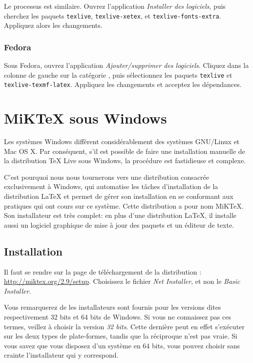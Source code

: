 Le processus est similaire. Ouvrez l'application \emph{Installer des logiciels}, puis cherchez les paquets \verb|texlive|, \verb|texlive-xetex|, et \verb|texlive-fonts-extra|. Appliquez alors les changements.

\subsubsection{Fedora}

Sous Fedora, ouvrez l'application \emph{Ajouter/supprimer des logiciels}. Cliquez dans la colonne de gauche sur la catégorie , puis sélectionnez les paquets \verb|texlive| et \verb|texlive-texmf-latex|. Appliquez les changements et acceptez les dépendances.

\section{MiKTeX sous Windows}


Les systèmes Windows diffèrent considérablement des systèmes GNU/Linux et Mac OS X. Par conséquent, s'il est possible de faire une installation manuelle de la distribution TeX Live sous Windows, la procédure est fastidieuse et complexe.

C'est pourquoi nous nous tournerons vers une distribution consacrée exclusivement à Windows, qui automatise les tâches d'installation de la distribution \LaTeX{} et permet de gérer son installation en se conformant aux pratiques qui ont cours sur ce système. Cette distribution a pour nom MiKTeX. Son installateur est très complet: en plus d'une distribution \LaTeX{}, il installe aussi un logiciel graphique de mise à jour des paquets et un éditeur de texte.

\subsection{Installation}

Il faut se rendre sur la page de téléchargement de la distribution : \url{http://miktex.org/2.9/setup}. Choisissez le fichier \emph{Net Installer}, et non le \emph{Basic Installer}.

\begin{attention}
Vous remarquerez de les installateurs sont fournis pour les versions dites respectivement 32 bits et 64 bits de Windows. Si vous ne connaissez pas ces termes, veillez à choisir la version \emph{32 bits}. Cette dernière peut en effet s'exécuter sur les deux types de plate-formes, tandis que la réciproque n'est pas vraie. Si vous savez que vous disposez d'un système en 64 bits, vous pouvez choisir sans crainte l'installateur qui y correspond.
\end{attention}

